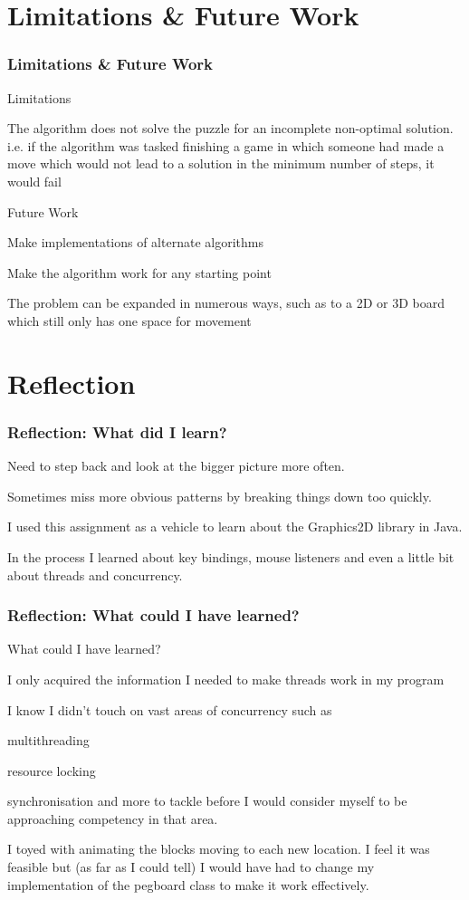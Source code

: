 \documentclass{beamer}
\begin{document}
\section{Limitations \& Future Work}
	\begin{frame}
		\frametitle{Limitations \& Future Work}
		Limitations
		\blt
			\item The algorithm does not solve the puzzle for an incomplete non-optimal solution. \\
			\tab i.e. if the algorithm was tasked finishing a game in which someone had made a move which
			 would not lead to a solution in the minimum number of steps, it would fail
		\finblt
		
		Future Work
		\blt
			\item Make implementations of alternate algorithms 
			\item Make the algorithm work for any starting point
			\item The problem can be expanded in numerous ways, such as to a 2D or 3D board which still 
			only has one space for movement
			
		\finblt
	\end{frame}
\section{Reflection}
	\begin{frame}
		\frametitle{Reflection: What did I learn?}

		\blt
			\item Need to step back and look at the bigger picture more often. 
			\item Sometimes miss 
			more obvious patterns by breaking things down too quickly.
			\vfill
			\item I used this assignment as a vehicle to learn about the Graphics2D library in Java. 
			\item In the process I learned about key bindings, mouse listeners and even a little bit about 
			threads and concurrency. 
		\finblt
		

	\end{frame}
	
	\begin{frame}
		\frametitle{Reflection: What could I have learned?}
		What could I have learned?
		\blt
			\item I only acquired the information I needed to make threads work in my program
			\item I know I didn't touch on vast areas of concurrency such as
			\blt
				\item multithreading
				\item resource locking
				\item synchronisation
			\finblt 
			and more to tackle before I would consider myself to be approaching competency in that area. 
			\item I toyed with animating the blocks moving to each new location. I feel it was 
			feasible but (as far as I could tell) I would have had to change my implementation of the 
			pegboard class to make it work effectively. 
		\finblt
	\end{frame}
\end{document}
